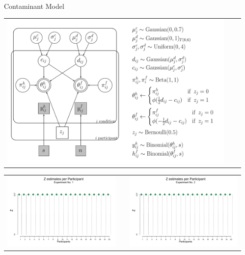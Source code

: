 \documentclass[final]{beamer}
\newlength{\sepwid}
\newlength{\onecolwid}
\begin{document}
\begin{frame}[t]
\begin{columns}[t]
\begin{column}{\sepwid}\end{column} %

\setlength{\onecolwid}{0.252\paperwidth} %
\begin{column}{\onecolwid} %


\begin{alertblock}{Contaminant Model}


\begin{center}
\begin{tabular}{ccc}
\includegraphics[width=0.7\linewidth]{Figures/4_Contaminant.pdf}
\end{tabular}
\end{center}


\begin{center}
\begin{tabular}{ccc}
\includegraphics[width=0.48\linewidth]{Figures/4-Exp1_Beta11.pdf}  & \hfill & \includegraphics[width=0.48\linewidth]{Figures/4-Exp2_Beta11-20.pdf}
\end{tabular}
\end{center}


\end{alertblock}
\end{column}
\end{columns}
\end{frame}
\end{document}
